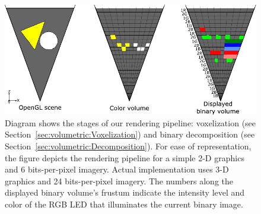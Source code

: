 \begin{figure}[tb!]
\centering
\includegraphics[width=\columnwidth]{images/volumetric/binary_decomposition}
\caption[Volumetric NED: color volume to binary volume decomposition]{Diagram shows the stages of our rendering pipeline: voxelization (see Section~\ref{sec:volumetric:Voxelization}) and binary decomposition (see Section~\ref{sec:volumetric:Decomposition}). For ease of representation, the figure depicts the rendering pipeline for a simple 2-D graphics and 6 bits-per-pixel imagery. Actual implementation uses 3-D graphics and 24 bits-per-pixel imagery. The numbers along the displayed binary volume's frustum indicate the intensity level and color of the RGB LED that illuminates the current binary image.}
\label{fig:volumetric:binary_decomposition}
\end{figure}

